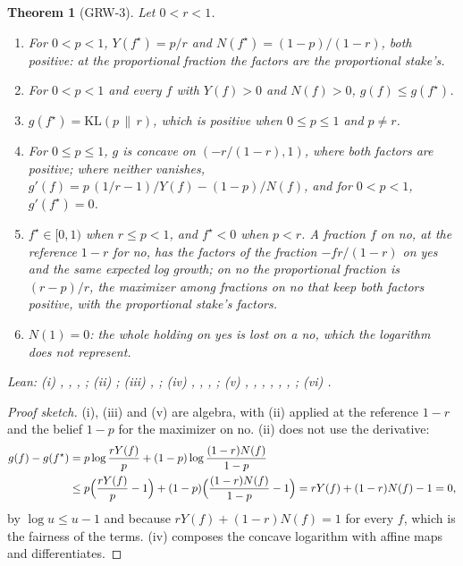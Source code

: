 \documentclass[11pt]{article}
\theoremstyle{plain}
\newtheorem{theorem}{Theorem}[section]
\theoremstyle{definition}
\theoremstyle{remark}
\newenvironment{leannames}{\par\smallskip\small\raggedright\upshape\noindent Lean: }{\par}
\newcommand{\KL}[2]{\mathrm{KL}(#1\,\|\,#2)}
\begin{document}
\begin{theorem}[GRW-3]
\label{thm:grw3}
Let $0<r<1$.
\begin{enumerate}
  \item[(i)] For $0<p<1$, $Y(f^\star)=p/r$ and $N(f^\star)=(1-p)/(1-r)$, both positive: at the
    proportional fraction the factors are the proportional stake's.
  \item[(ii)] For $0<p<1$ and every $f$ with $Y(f)>0$ and $N(f)>0$, $g(f)\le g(f^\star)$.
  \item[(iii)] $g(f^\star)=\KL{p}{r}$, which is positive when $0\le p\le1$ and $p\ne r$.
  \item[(iv)] For $0\le p\le1$, $g$ is concave on $(-r/(1-r),1)$, where both factors are positive;
    where neither vanishes, $g'(f)=p\,(1/r-1)/Y(f)-(1-p)/N(f)$, and for $0<p<1$,
    $g'(f^\star)=0$.
  \item[(v)] $f^\star\in[0,1)$ when $r\le p<1$, and $f^\star<0$ when $p<r$. A fraction $f$ on no, at
    the reference $1-r$ for no, has the factors of the fraction $-fr/(1-r)$ on yes and the same
    expected log growth; on no the proportional fraction is $(r-p)/r$, the maximizer among
    fractions on no that keep both factors positive, with the proportional stake's factors.
  \item[(vi)] $N(1)=0$: the whole holding on yes is lost on a no, which the logarithm does not
    represent.
\end{enumerate}
\begin{leannames}
(i) , , ,
; (ii) ; (iii)
, ; (iv)
, , ,
; (v) ,
, , ,
, ,
; (vi) .
\end{leannames}
\end{theorem}

\begin{proof}[Proof sketch]
(i), (iii) and (v) are algebra, with (ii) applied at the reference $1-r$ and the belief $1-p$ for
the maximizer on no. (ii) does not use the derivative:
\begin{align*}
  g(f)-g(f^\star)&=p\log\frac{rY(f)}{p}+(1-p)\log\frac{(1-r)N(f)}{1-p}\\
  &\le p\Bigl(\frac{rY(f)}{p}-1\Bigr)+(1-p)\Bigl(\frac{(1-r)N(f)}{1-p}-1\Bigr)
  =rY(f)+(1-r)N(f)-1=0,
\end{align*}
by $\log u\le u-1$ and because $rY(f)+(1-r)N(f)=1$ for every $f$, which is the fairness of the
terms. (iv) composes the concave logarithm with affine maps and differentiates.
\end{proof}
\end{document}
